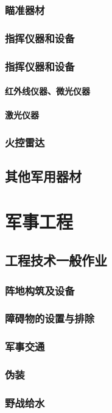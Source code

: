 \documentclass[UTF8]{../ApplicationUniverse}
\begin{document}
        \subsubsection{瞄准器材}
        \subsubsection{指挥仪器和设备}
        \subsubsection{指挥仪器和设备}
            \paragraph{红外线仪器、微光仪器}
            \paragraph{激光仪器}
        \subsubsection{火控雷达}
    \subsection{其他军用器材}

\section{军事工程}
    \subsection{工程技术一般作业}
        \subsubsection{阵地构筑及设备}
        \subsubsection{障碍物的设置与排除}
        \subsubsection{军事交通}
        \subsubsection{伪装}
        \subsubsection{野战给水}
\end{document}
